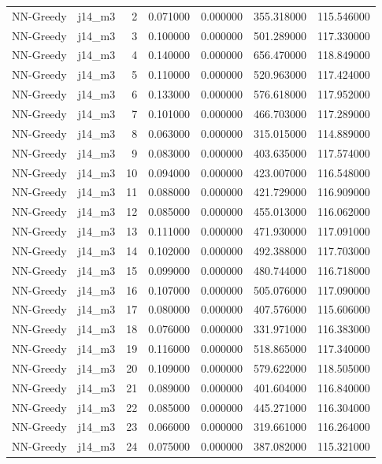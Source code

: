 \begin{tabular}{llrrrrr}
NN-Greedy & j14_m3 & 2 & 0.071000 & 0.000000 & 355.318000 & 115.546000 \\
NN-Greedy & j14_m3 & 3 & 0.100000 & 0.000000 & 501.289000 & 117.330000 \\
NN-Greedy & j14_m3 & 4 & 0.140000 & 0.000000 & 656.470000 & 118.849000 \\
NN-Greedy & j14_m3 & 5 & 0.110000 & 0.000000 & 520.963000 & 117.424000 \\
NN-Greedy & j14_m3 & 6 & 0.133000 & 0.000000 & 576.618000 & 117.952000 \\
NN-Greedy & j14_m3 & 7 & 0.101000 & 0.000000 & 466.703000 & 117.289000 \\
NN-Greedy & j14_m3 & 8 & 0.063000 & 0.000000 & 315.015000 & 114.889000 \\
NN-Greedy & j14_m3 & 9 & 0.083000 & 0.000000 & 403.635000 & 117.574000 \\
NN-Greedy & j14_m3 & 10 & 0.094000 & 0.000000 & 423.007000 & 116.548000 \\
NN-Greedy & j14_m3 & 11 & 0.088000 & 0.000000 & 421.729000 & 116.909000 \\
NN-Greedy & j14_m3 & 12 & 0.085000 & 0.000000 & 455.013000 & 116.062000 \\
NN-Greedy & j14_m3 & 13 & 0.111000 & 0.000000 & 471.930000 & 117.091000 \\
NN-Greedy & j14_m3 & 14 & 0.102000 & 0.000000 & 492.388000 & 117.703000 \\
NN-Greedy & j14_m3 & 15 & 0.099000 & 0.000000 & 480.744000 & 116.718000 \\
NN-Greedy & j14_m3 & 16 & 0.107000 & 0.000000 & 505.076000 & 117.090000 \\
NN-Greedy & j14_m3 & 17 & 0.080000 & 0.000000 & 407.576000 & 115.606000 \\
NN-Greedy & j14_m3 & 18 & 0.076000 & 0.000000 & 331.971000 & 116.383000 \\
NN-Greedy & j14_m3 & 19 & 0.116000 & 0.000000 & 518.865000 & 117.340000 \\
NN-Greedy & j14_m3 & 20 & 0.109000 & 0.000000 & 579.622000 & 118.505000 \\
NN-Greedy & j14_m3 & 21 & 0.089000 & 0.000000 & 401.604000 & 116.840000 \\
NN-Greedy & j14_m3 & 22 & 0.085000 & 0.000000 & 445.271000 & 116.304000 \\
NN-Greedy & j14_m3 & 23 & 0.066000 & 0.000000 & 319.661000 & 116.264000 \\
NN-Greedy & j14_m3 & 24 & 0.075000 & 0.000000 & 387.082000 & 115.321000 \\

\end{tabular}
